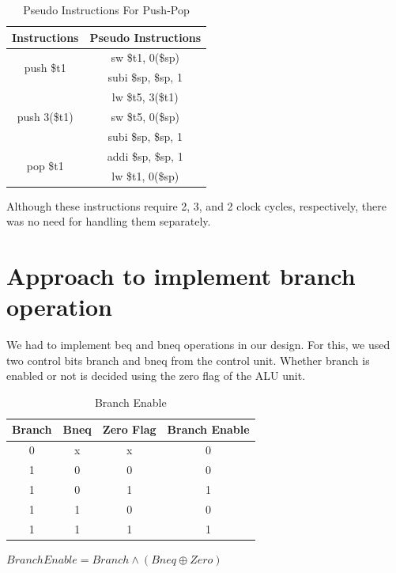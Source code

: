 \documentclass{article}
\begin{document}
\begin{table}[!h]
    \centering
    \begin{tabular}{|c|c|}
        \hline
        Instructions & Pseudo Instructions \\ 
        \hline
        \multirow{2}{*}{push \$t1} & sw \$t1, 0(\$sp) \\
         & subi \$sp, \$sp, 1 \\ 
         \hline
         \multirow{3}{*}{push 3(\$t1)} & lw \$t5, 3(\$t1) \\
        & sw \$t5, 0(\$sp) \\
        & subi \$sp, \$sp, 1 \\ 
        \hline 
        \multirow{2}{*}{pop \$t1} & addi \$sp, \$sp, 1 \\
        & lw \$t1, 0(\$sp) \\ 
        \hline
    \end{tabular}
    \caption{Pseudo Instructions For Push-Pop}
    \label{tab:3}
\end{table}

Although these instructions require 2, 3, and 2 clock cycles, respectively, there was no need for handling them separately.

\section{Approach to implement branch operation}

We had to implement beq and bneq operations in our design. For this, we used two control bits branch and bneq from the control unit. Whether branch is enabled or not is decided using the zero flag of the ALU unit.

\begin{table}[!h]
    \centering
    \begin{tabular}{|c|c|c|c|}
         \hline
        Branch & Bneq & Zero Flag & Branch Enable \\ \hline
         0 & x & x & 0 \\ \hline
         1 & 0 & 0 & 0 \\ \hline
         1 & 0 & 1 & 1 \\ \hline
         1 & 1 & 0 & 0 \\ \hline
         1 & 1 & 1 & 1 \\ \hline
         \hline
    \end{tabular}
    \caption{Branch Enable}
    \label{tab:BEN}
\end{table}
\raggedright
$Branch Enable = Branch \land ( Bneq \oplus Zero  )$
\end{document}
